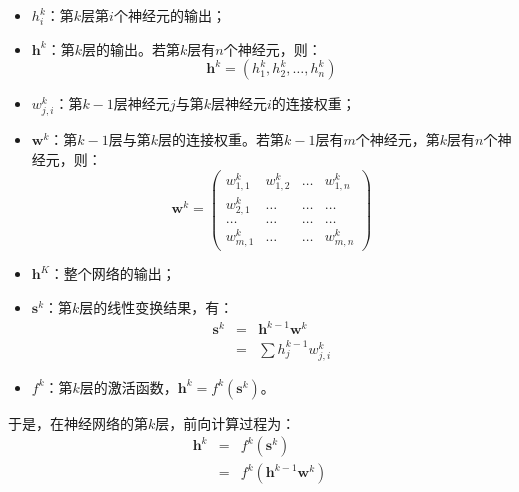 \begin{itemize}
\vspace{0.5em}
\item  $ h_i^k $：第$ k $层第$ i $个神经元的输出；
\vspace{0.5em}
\item  $ \mathbf h^k $：第$ k $层的输出。若第$ k $层有$ n $个神经元，则：
       \begin{equation}
       \mathbf h^k=(h_1^k,h_2^k,\dots,h_n^k)
       \end{equation}
\vspace{0.5em}
\item  $ w_{j,i}^k $：第$ k-1 $层神经元$ j $与第$ k $层神经元$ i $的连接权重；
\vspace{0.5em}
\item  $ \mathbf w^k $：第$ k-1 $层与第$ k $层的连接权重。若第$ k-1 $层有$ m $个神经元，第$ k $层有$ n $个神经元，则：
       \begin{equation}
       \mathbf w^k = \begin{pmatrix} w_{1,1}^k & w_{1,2}^k & \dots & w_{1,n}^k\\w_{2,1}^k & \dots & \dots & \dots\\ \dots & \dots & \dots & \dots\\w_{m,1}^k & \dots & \dots & w_{m,n}^k\end{pmatrix}
       \end{equation}
\vspace{0.5em}
\item  $ \mathbf h^K $：整个网络的输出；
\vspace{0.5em}
\item  $ \mathbf s^k $：第$ k $层的线性变换结果，有：
       \begin{eqnarray}
       \mathbf s^k & = & \mathbf h^{k-1}\mathbf w^k \nonumber \\
                   & = & \sum{h_j^{k-1}w_{j,i}^k}
       \end{eqnarray}
\vspace{0.5em}
\item  $ f^k $：第$ k $层的激活函数，$ \mathbf h^k=f^k(\mathbf s^k)$。
\vspace{0.5em}
\end{itemize}

\parinterval  于是，在神经网络的第$ k $层，前向计算过程为：
\begin{eqnarray}
\mathbf h^k & = & f^k(\mathbf s^k) \nonumber \nonumber \\
            & = & f^k(\mathbf h^{k-1}\mathbf w^k)
\label{eq:5-46}
\end{eqnarray}

